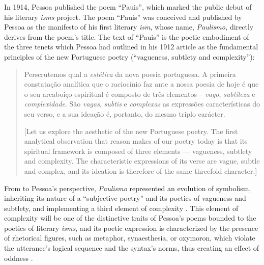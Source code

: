 \documentclass{article}
\begin{document}
In 1914, Pessoa published the poem ``Pauis'', which marked the public
debut of his literary \emph{isms} project. The poem ``Pauis'' was
conceived and published by Pessoa as the manifesto of his first literary
\emph{ism}, whose name, \emph{Paulismo,} directly derives from the
poem's title. The text of ``Pauis'' is the poetic embodiment of the
three tenets which Pessoa had outlined in his 1912 article as the
fundamental principles of the new Portuguese poetry (``vagueness,
subtlety and complexity''):

\begin{quote}
 Perscrutemos qual a \emph{estética} da nova poesia portuguesa. A
primeira constatação analítica que o raciocínio faz ante a nossa poesia
de hoje é que o seu arcaboiço espiritual é composto de três elementos
-- \emph{vago}, \emph{subtileza} e \emph{complexidade}. São
\emph{vagas}, \emph{subtis} e \emph{complexas} as expressões
características do seu verso, e a sua ideação é, portanto, do mesmo
triplo carácter.

\vspace{1em}

[Let us explore the aesthetic of the new Portuguese poetry. The first
analytical observation that reason makes of our poetry today is that its
spiritual framework is composed of three elements –– vagueness, subtlety
and complexity. The characteristic expressions of its verse are vague,
subtle and complex, and its ideation is therefore of the same threefold
character.]

\begin{flushright}
    \parencite[90]{pessoa_nova_1912}
\end{flushright} 
\end{quote}

From to Pessoa's perspective, \emph{Paulismo} represented an
evolution of symbolism, inheriting its nature of a ``subjective poetry''
and its poetics of vagueness and subtlety, and implementing a third
element of complexity \parencite[91]{pessoa_nova_1912}. This element of complexity will
be one of the distinctive traits of Pessoa's poems bounded to the
poetics of literary \emph{isms}, and its poetic expression is
characterized by the presence of rhetorical figures, such as metaphor,
synaesthesia, or oxymoron, which violate the utterance's logical
sequence and the syntax's norms, thus creating an effect of oddness \parencite[22]{morna_poesia_1982}.
\end{document}
